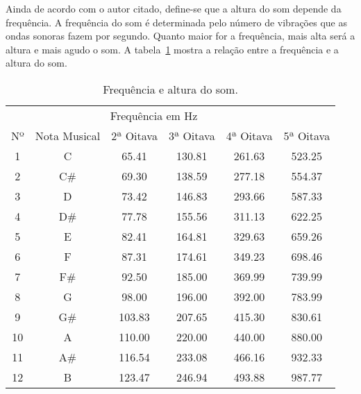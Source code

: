 \documentclass{sbrt}
\begin{document}
Ainda de acordo com o autor citado, define-se que a altura do som depende da frequência. A frequência do som é determinada pelo número de vibrações que as ondas sonoras fazem por segundo. Quanto maior for a frequência, mais alta será a altura e mais agudo o som. A tabela~\ref{tab:freq} mostra a relação entre a frequência e a altura do som.
\begin{table}[ht]
  \centering
  \caption{\label{tab:freq} Frequência e altura do som.}
  \vspace{-0.2cm}
  \begin{tabular}{c c c c c c}
       & \multicolumn{4}{c}{Frequência em Hz}                                                 \\
    Nº & Nota Musical                         & 2ª Oitava & 3ª Oitava & 4ª Oitava & 5ª Oitava \\
    \hline
    1  & C                                    & 65.41     & 130.81    & 261.63    & 523.25    \\
    2  & C\#                                  & 69.30     & 138.59    & 277.18    & 554.37    \\
    3  & D                                    & 73.42     & 146.83    & 293.66    & 587.33    \\
    4  & D\#                                  & 77.78     & 155.56    & 311.13    & 622.25    \\
    5  & E                                    & 82.41     & 164.81    & 329.63    & 659.26    \\
    6  & F                                    & 87.31     & 174.61    & 349.23    & 698.46    \\
    7  & F\#                                  & 92.50     & 185.00    & 369.99    & 739.99    \\
    8  & G                                    & 98.00     & 196.00    & 392.00    & 783.99    \\
    9  & G\#                                  & 103.83    & 207.65    & 415.30    & 830.61    \\
    10 & A                                    & 110.00    & 220.00    & 440.00    & 880.00    \\
    11 & A\#                                  & 116.54    & 233.08    & 466.16    & 932.33    \\
    12 & B                                    & 123.47    & 246.94    & 493.88    & 987.77    \\
  \end{tabular}
\end{table}
\end{document}
